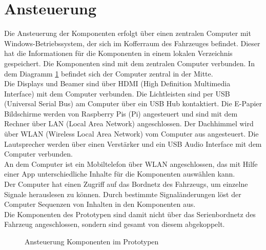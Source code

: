 \section{Ansteuerung}
Die Ansteuerung der Komponenten erfolgt über einen zentralen Computer mit Windows-Betriebssystem, der sich im Kofferraum des Fahrzeuges befindet. Dieser hat die Informationen für die Komponenten in einem lokalen Verzeichnis gespeichert. Die Komponenten sind mit dem zentralen Computer verbunden. In dem Diagramm \ref{fig:tikz_ansteuerung} befindet sich der Computer zentral in der Mitte.\\
Die Displays und Beamer sind über HDMI (High Definition Multimedia Interface) mit dem Computer verbunden. Die Lichtleisten sind per USB (Universal Serial Bus) am Computer über ein USB Hub kontaktiert. Die E-Papier Bildschirme werden von Raspberry Pis (Pi) angesteuert und sind mit dem Rechner über LAN (Local Area Network) angeschlossen. Der Dachhimmel wird über WLAN (Wireless Local Area Network) vom Computer aus angesteuert. Die Lautsprecher werden über einen Verstärker und ein USB Audio Interface mit dem Computer verbunden.\\
An dem Computer ist ein Mobiltelefon über WLAN angeschlossen, das mit Hilfe einer App unterschiedliche Inhalte für die Komponenten auswählen kann.\\
Der Computer hat einen Zugriff auf das Bordnetz des Fahrzeugs, um einzelne Signale herauslesen zu können. Durch bestimmte Signaländerungen löst der Computer Sequenzen von Inhalten in den Komponenten aus.\\
Die Komponenten des Prototypen sind damit nicht über das Serienbordnetz des Fahrzeug angeschlossen, sondern sind gesamt von diesem abgekoppelt.
\begin{figure}[hbt]
	\centering
	
	\caption[Ansteuerung Komponenten im Prototypen]{Ansteuerung Komponenten im Prototypen}
	\label{fig:tikz_ansteuerung}
\end{figure}
